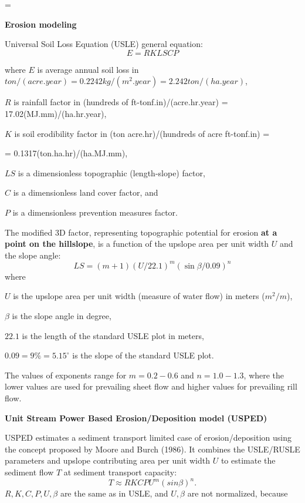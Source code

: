 \magnification=
\baselineskip=0.68cm
\hsize=5.4in
\def\und{\underbar}
\def\sp{\scriptstyle}
\def\spp{\scriptscriptstyle}
\def\tabrule{\noalign{\vskip 5truept \hrule\vskip 5truept} }
\def\tabrul2{\noalign{\vskip 5truept \hrule\vskip 2truept \hrule\vskip 5truept} }
\def\fbb {~\bar{\kern-0.325em \bar f}}
\def\bnabla{\mb \nabla}

\centerline {\bf Erosion modeling}
Universal Soil Loss Equation (USLE) general equation:
$$
E = R K L S C P
$$

\noindent
where
$E$ is average annual soil loss in $ton/(acre.year)=0.2242kg/(m^2.year)=2.242ton/(ha.year)$,

\noindent
$R$ is rainfall factor in (hundreds of ft-tonf.in)/(acre.hr.year) = 17.02(MJ.mm)/(ha.hr.year),

\noindent
$K$ is soil erodibility factor in (ton acre.hr)/(hundreds of acre ft-tonf.in) =

\noindent
= 0.1317(ton.ha.hr)/(ha.MJ.mm),

\noindent
$LS$ is a dimensionless topographic (length-slope) factor,

\noindent
$C$ is a dimensionless land cover factor, and

\noindent
$P$ is a dimensionless prevention measures factor.

\noindent
The modified  3D factor, representing topographic potential
for erosion {\bf at a point on the hillslope}, is
a function of the upslope area per unit width $U$ and the slope angle:
$$
LS=(m+1) \left(U/22.1\right)^m \left({\sin{\beta}}/{0.09}\right)^n
$$
\noindent
where

\noindent
$U$ is the upslope area per unit width (measure of water flow) in meters ($m^2/m$),

\noindent
$\beta$ is the slope angle in degree,

\noindent
$22.1$ is the length of the standard USLE plot in meters,

\noindent
$0.09 = 9\% = 5.15^{\circ}$ is the slope of the standard USLE plot.

\noindent
The values of exponents range for $m=0.2-0.6$ and
$n=1.0-1.3$, where the lower values are used for prevailing sheet flow and
higher values for prevailing rill flow.

\smallskip
{\bf Unit Stream Power Based Erosion/Deposition model (USPED)}

\noindent
 USPED estimates a sediment transport limited case of erosion/deposition
using the concept proposed by Moore and Burch (1986).
It combines the USLE/RUSLE parameters
and upslope contributing area per unit width $U$ to estimate the
sediment flow $T$ at sediment transport capacity:
$$
 T \approx R K C P U^m (sin \beta)^n.
$$
\noindent
$R, K, C, P, U, \beta$ are the same as in USLE,
and $U, \beta$ are not normalized, because

